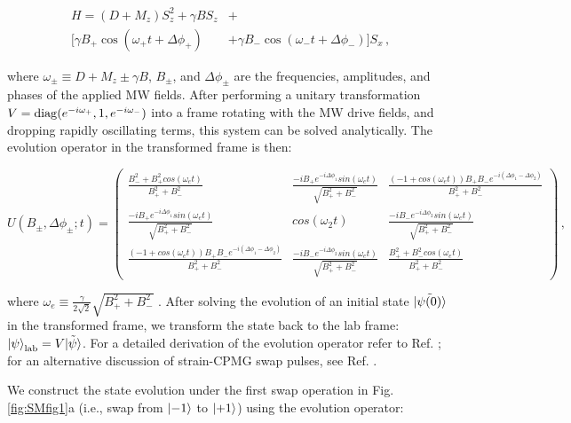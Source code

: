\documentclass[reprint,superscriptaddress,hyphens,amsmath,amssymb,aps,prx,float]{revtex4-2}
\begin{document}
\begin{equation}
\begin{split}
    H = (D+M_z) S_z^2 + \gamma B S_z  &+ \\  [\gamma B_+ \cos(\omega_+ t + \Delta \phi_+) &+ \gamma B_- \cos(\omega_- t + \Delta \phi_-)]S_x\,,
    \end{split}
\end{equation}

where $\omega_\pm \equiv D+M_z\pm\gamma B$, $B_\pm$, and $\Delta \phi_\pm$ are the frequencies, amplitudes, and phases of the applied MW fields. 
After performing a unitary transformation $V = {\rm diag}(e^{-i \omega_+},1,e^{-i \omega_-})$ into a frame rotating with the MW drive fields, and dropping rapidly oscillating terms, this system can be solved analytically. The evolution operator in the transformed frame is then:
\begin{widetext}
\begin{equation}
\label{eqn:evulution}
U(B_\pm,\Delta \phi_\pm;t) = \left(\begin{matrix}
\frac{B_-^2 + B_+^2 cos(\omega_e t)}{B_+^2 + B_-^2} & \frac{-i B_+ e^{-i \Delta \phi_1}sin(\omega_e t)}{\sqrt{B_+^2 + B_-^2}} & \frac{(-1+cos(\omega_e t)) B_+ B_- e^{-i (\Delta \phi_1-\Delta \phi_2)} }{B_+^2 + B_-^2}\\
\frac{-i B_+ e^{-i \Delta \phi_1}sin(\omega_e t)}{\sqrt{B_+^2 + B_-^2}} & cos(\omega_2 t) & \frac{-i B_- e^{-i \Delta \phi_2}sin(\omega_e t)}{\sqrt{B_+^2 + B_-^2}} \\ 
\frac{(-1+cos(\omega_e t)) B_+ B_- e^{-i (\Delta \phi_1-\Delta \phi_2)}}{B_+^2 + B_-^2} & \frac{-i B_- e^{-i \Delta \phi_2}sin(\omega_e t)}{\sqrt{B_+^2 + B_-^2}} & \frac{B_+^2 + B_-^2 cos(\omega_e t)}{B_+^2 + B_-^2} 
\end{matrix}\right)\,,
\end{equation}
\end{widetext}
where $\omega_e\equiv\frac{\gamma}{2\sqrt{2}}\sqrt{B_+^2 + B_-^2}$ \cite{MaminNanoNMR2013}. After solving the evolution of an initial state $\tilde{\ket{\psi(0)}}$ in the transformed frame, we transform the state back to the lab frame: $\ket{\psi}_{\rm lab} = V \tilde{\ket{\psi}}$. For a detailed derivation of the evolution operator refer to Ref. \cite{MaminNanoNMR2013}; for an alternative discussion of strain-CPMG swap pulses, see Ref. \cite{AwschalomThermometry2013}. 

We construct the state evolution under the first swap operation in Fig. \ref{fig:SMfig1}a (i.e., swap from $\ket{-1}$ to $\ket{+1}$) using the evolution operator:
\end{document}
